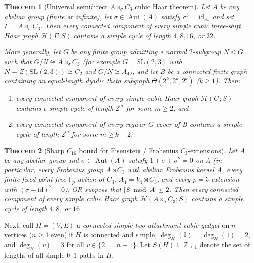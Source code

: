 \documentclass[11pt]{amsart}
\newtheorem{theorem}{Theorem}[section]
\theoremstyle{definition}
\theoremstyle{remark}
\newcommand{\F}{\mathbb{F}}
\newcommand{\Z}{\mathbb{Z}}
\newcommand{\Haar}{\mathcal{H}}
\newcommand{\Aut}{\operatorname{Aut}}
\newcommand{\id}{\mathrm{id}}
\begin{document}
\begin{theorem}[Universal semidirect $A \rtimes_\sigma C_3$ cubic Haar theorem]\label{thm:semidirect_gen}
Let $A$ be any abelian group (finite or infinite), let $\sigma \in \Aut(A)$ satisfy $\sigma^3 = \id_A$, and set $\Gamma = A \rtimes_\sigma C_3$. Then every connected component of every simple cubic three-shift Haar graph $\Haar(\Gamma; S)$ contains a simple cycle of length $4, 8, 16$, or $32$.

More generally, let $G$ be any finite group admitting a normal $2$-subgroup $N \trianglelefteq G$ such that $G/N \cong A \rtimes_\sigma C_3$ (for example $G = \mathrm{SL}(2,3)$ with $N = Z(\mathrm{SL}(2,3)) \cong C_2$ and $G/N \cong A_4$), and let $B$ be a connected finite graph containing an equal-length dyadic theta subgraph $\Theta(2^k, 2^k, 2^k)$ ($k \ge 1$). Then:
\begin{enumerate}[label=(\alph*)]
\item every connected component of every simple cubic Haar graph $\Haar(G; S)$ contains a simple cycle of length $2^m$ for some $m \ge 2$; and
\item every connected component of every regular $G$-cover of $B$ contains a simple cycle of length $2^m$ for some $m \ge k + 2$.
\end{enumerate}
\end{theorem}

\begin{theorem}[Sharp $C_{16}$ bound for Eisenstein / Frobenius $C_3$-extensions]\label{thm:eisenstein}
Let $A$ be any abelian group and $\sigma \in \Aut(A)$ satisfy $1 + \sigma + \sigma^2 = 0$ on $A$ (in particular, every Frobenius group $A \rtimes C_3$ with abelian Frobenius kernel $A$, every finite fixed-point-free $\F_p$-action of $C_3$, $A_4 = V_4 \rtimes C_3$, and every $p=3$ extension with $(\sigma - \id)^2 = 0$), OR suppose that $|S \bmod A| \le 2$. Then every connected component of every simple cubic Haar graph $\Haar(A \rtimes_\sigma C_3; S)$ contains a simple cycle of length $4, 8$, or $16$.
\end{theorem}

Next, call $H = (V, E)$ a \emph{connected simple two-attachment cubic gadget} on $n$ vertices ($n \ge 4$ even) if $H$ is connected and simple, $\deg_H(0) = \deg_H(1) = 2$, and $\deg_H(v) = 3$ for all $v \in \{2, \dots, n-1\}$. Let $S(H) \subseteq \Z_{\ge 1}$ denote the set of lengths of all simple $0\text{--}1$ paths in $H$.
\end{document}
